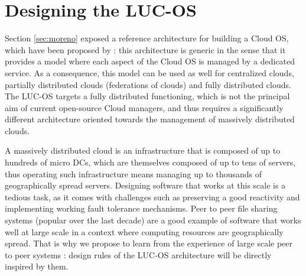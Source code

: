 \section{Designing the LUC-OS}
\label{sec:lucos}


Section \ref{sec:moreno} exposed a reference architecture for building a Cloud 
OS, which have been proposed by \cite{moreno2012iaas}: this architecture is 
generic in the sense that it provides a model where each aspect of the Cloud OS 
is managed by a dedicated service. As a consequence, this model can be used as 
well for centralized clouds, partially distributed clouds (federations of 
clouds) and fully distributed clouds. The LUC-OS targets a fully distributed 
functioning, which is not the principal aim of current open-source Cloud 
managers, and thus requires a significantly different architecture oriented 
towards the management of massively distributed clouds.

A massively distributed cloud is an infrastructure that is composed of up to 
hundreds of micro DCs, which are themselves composed of up to tens of servers, 
thus operating such infrastructure means managing up to thousands of
geographically spread servers. Designing software that works at this scale is a
tedious task, as it comes with challenges such as preserving a good reactivity 
and implementing working fault tolerance mechanisms. Peer to peer file sharing 
systems (popular over the last decade) are a good example of software that works
well at large scale in a context where computing resources are geographically 
spread. That is why we propose to learn from the experience of large scale peer 
to peer systems : design rules of the LUC-OS architecture will be directly 
inspired by them. 

